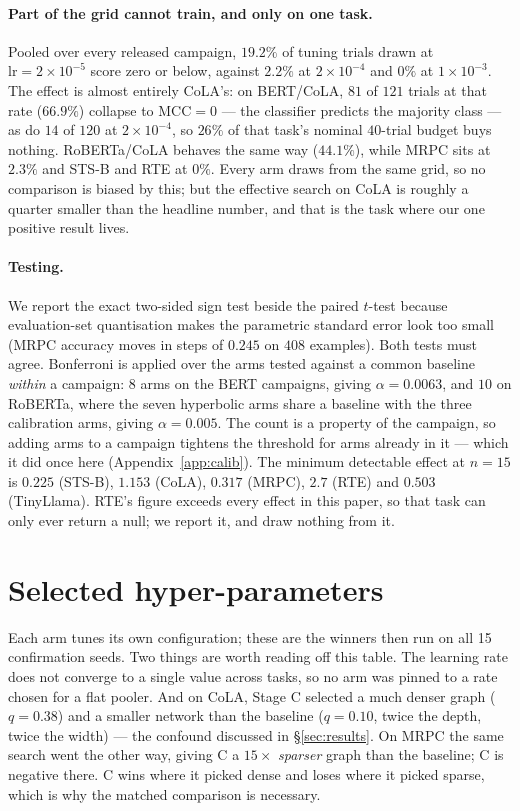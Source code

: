 \documentclass{article}
\begin{document}
\paragraph{Part of the grid cannot train, and only on one task.} Pooled over
every released campaign, $19.2\%$ of tuning trials drawn at
$\mathrm{lr}=2\times10^{-5}$ score zero or below, against $2.2\%$ at
$2\times10^{-4}$ and $0\%$ at $1\times10^{-3}$. The effect is almost entirely
CoLA's: on BERT/CoLA, $81$ of $121$ trials at that rate ($66.9\%$) collapse to
$\mathrm{MCC}=0$ --- the classifier predicts the majority class --- as do $14$
of $120$ at $2\times10^{-4}$, so $26\%$ of that task's nominal $40$-trial
budget buys nothing. RoBERTa/CoLA behaves the same way ($44.1\%$), while MRPC
sits at $2.3\%$ and STS-B and RTE at $0\%$. Every arm draws from the same grid,
so no comparison is biased by this; but the effective search on CoLA is roughly
a quarter smaller than the headline number, and that is the task where our one
positive result lives.

\paragraph{Testing.} We report the exact two-sided sign test beside the paired
$t$-test because evaluation-set quantisation makes the parametric standard error
look too small (MRPC accuracy moves in steps of $0.245$ on $408$ examples). Both
tests must agree. Bonferroni is applied over the arms tested against a common
baseline \emph{within} a campaign: $8$ arms on the BERT campaigns, giving
$\alpha = 0.0063$, and $10$ on RoBERTa, where the seven hyperbolic arms share a
baseline with the three calibration arms, giving $\alpha = 0.005$. The count is
a property of the campaign, so adding arms to a campaign tightens the threshold
for arms already in it --- which it did once here
(Appendix~\ref{app:calib}). The minimum detectable effect at $n=15$ is $0.225$
(STS-B), $1.153$ (CoLA), $0.317$ (MRPC), $2.7$ (RTE) and $0.503$ (TinyLlama).
RTE's figure exceeds every effect in this paper, so that task can only ever
return a null; we report it, and draw nothing from it.

\section{Selected hyper-parameters}
\label{app:hp}

Each arm tunes its own configuration; these are the winners then run on all 15
confirmation seeds. Two things are worth reading off this table. The learning
rate does not converge to a single value across tasks, so no arm was pinned to a
rate chosen for a flat pooler. And on CoLA, Stage C selected a much denser graph
($q = 0.38$) and a smaller network than the baseline ($q = 0.10$, twice the
depth, twice the width) --- the confound discussed in \S\ref{sec:results}. On
MRPC the same search went the other way, giving C a $15\times$ \emph{sparser}
graph than the baseline; C is negative there. C wins where it picked dense and
loses where it picked sparse, which is why the matched comparison is necessary.
\end{document}
